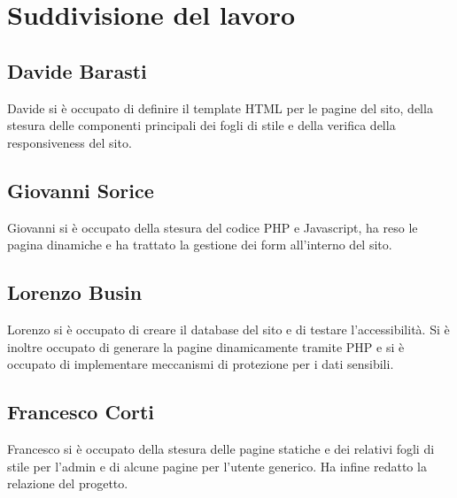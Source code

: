 \newpage

\section{Suddivisione del lavoro}

\subsection{Davide Barasti}
Davide si è occupato di definire il template HTML per le pagine del sito, della stesura delle componenti principali dei fogli di stile e della verifica della responsiveness del sito.

\subsection{Giovanni Sorice}
Giovanni si è occupato della stesura del codice PHP e Javascript, ha reso le pagina dinamiche e ha trattato la gestione dei form all'interno del sito.

\subsection{Lorenzo Busin}
Lorenzo si è occupato di creare il database del sito e di testare l'accessibilità. Si è inoltre occupato di generare la pagine dinamicamente tramite PHP e si è occupato di implementare meccanismi di protezione per i dati sensibili.

\subsection{Francesco Corti}
Francesco si è occupato della stesura delle pagine statiche e dei relativi fogli di stile per l'admin e di alcune pagine per l'utente generico. Ha infine redatto la relazione del progetto. 